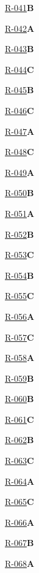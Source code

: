 \noindent\hyperref[q:R-041]{R-041}\hfill\textbf{B}\par
\noindent\hyperref[q:R-042]{R-042}\hfill\textbf{A}\par
\noindent\hyperref[q:R-043]{R-043}\hfill\textbf{B}\par
\noindent\hyperref[q:R-044]{R-044}\hfill\textbf{C}\par
\noindent\hyperref[q:R-045]{R-045}\hfill\textbf{B}\par
\noindent\hyperref[q:R-046]{R-046}\hfill\textbf{C}\par
\noindent\hyperref[q:R-047]{R-047}\hfill\textbf{A}\par
\noindent\hyperref[q:R-048]{R-048}\hfill\textbf{C}\par
\noindent\hyperref[q:R-049]{R-049}\hfill\textbf{A}\par
\noindent\hyperref[q:R-050]{R-050}\hfill\textbf{B}\par
\noindent\hyperref[q:R-051]{R-051}\hfill\textbf{A}\par
\noindent\hyperref[q:R-052]{R-052}\hfill\textbf{B}\par
\noindent\hyperref[q:R-053]{R-053}\hfill\textbf{C}\par
\noindent\hyperref[q:R-054]{R-054}\hfill\textbf{B}\par
\noindent\hyperref[q:R-055]{R-055}\hfill\textbf{C}\par
\noindent\hyperref[q:R-056]{R-056}\hfill\textbf{A}\par
\noindent\hyperref[q:R-057]{R-057}\hfill\textbf{C}\par
\noindent\hyperref[q:R-058]{R-058}\hfill\textbf{A}\par
\noindent\hyperref[q:R-059]{R-059}\hfill\textbf{B}\par
\noindent\hyperref[q:R-060]{R-060}\hfill\textbf{B}\par
\noindent\hyperref[q:R-061]{R-061}\hfill\textbf{C}\par
\noindent\hyperref[q:R-062]{R-062}\hfill\textbf{B}\par
\noindent\hyperref[q:R-063]{R-063}\hfill\textbf{C}\par
\noindent\hyperref[q:R-064]{R-064}\hfill\textbf{A}\par
\noindent\hyperref[q:R-065]{R-065}\hfill\textbf{C}\par
\noindent\hyperref[q:R-066]{R-066}\hfill\textbf{A}\par
\noindent\hyperref[q:R-067]{R-067}\hfill\textbf{B}\par
\noindent\hyperref[q:R-068]{R-068}\hfill\textbf{A}\par
